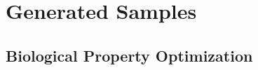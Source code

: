\documentclass[accepted]{uai2023} %
\begin{document}






\section{Generated Samples}
\subsection{Biological Property Optimization}
\end{document}
